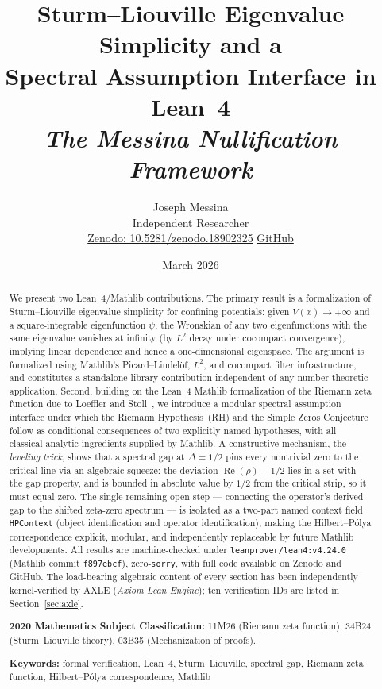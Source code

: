 \documentclass[12pt, a4paper]{article}
\title{\textbf{Sturm--Liouville Eigenvalue Simplicity and a\\[4pt]
  Spectral Assumption Interface in Lean~4}\\[6pt]
  \large\textit{The Messina Nullification Framework}}
\author{
  Joseph Messina\\[4pt]
  \small Independent Researcher\\[2pt]
  \small \href{https://doi.org/10.5281/zenodo.18902325}{Zenodo: 10.5281/zenodo.18902325}
  \quad
  \href{https://github.com/Joeyxyxyz/messina-nullification-framework}{GitHub}
}
\date{March 2026}
\theoremstyle{plain}
\theoremstyle{definition}
\newcommand{\re}{\operatorname{Re}}
\newcommand{\lean}[1]{\texttt{#1}}
\newcommand{\Mathlib}{\textsf{Mathlib}}
\begin{document}
\maketitle

\begin{abstract}
We present two Lean~4/\Mathlib{} contributions.
The primary result is a formalization of Sturm--Liouville eigenvalue simplicity
for confining potentials: given $V(x) \to +\infty$ and a square-integrable
eigenfunction $\psi$, the Wronskian of any two eigenfunctions with the same
eigenvalue vanishes at infinity (by $L^2$ decay under cocompact convergence),
implying linear dependence and hence a one-dimensional eigenspace.
The argument is formalized using Mathlib's Picard--Lindel\"{o}f, $L^2$, and
cocompact filter infrastructure, and constitutes a standalone library
contribution independent of any number-theoretic application.
Second, building on the Lean~4 \Mathlib{} formalization of the Riemann zeta
function due to Loeffler and Stoll~\cite{loeffler2025}, we introduce a modular
spectral assumption interface under which the Riemann Hypothesis~(RH) and the
Simple Zeros Conjecture follow as conditional consequences of two explicitly
named hypotheses, with all classical analytic ingredients supplied by \Mathlib{}.
A constructive mechanism, the \emph{leveling trick}, shows that a spectral gap
at $\Delta = 1/2$ pins every nontrivial zero to the critical line via an
algebraic squeeze: the deviation $\re(\rho) - 1/2$ lies in a set with the
gap property, and is bounded in absolute value by $1/2$ from the critical
strip, so it must equal zero.
The single remaining open step --- connecting the operator's derived gap to the
shifted zeta-zero spectrum --- is isolated as a two-part named context field
\lean{HPContext} (object identification and operator identification), making the
Hilbert--P\'{o}lya correspondence explicit, modular, and independently
replaceable by future Mathlib developments.
All results are machine-checked under \texttt{leanprover/lean4:v4.24.0}
(Mathlib commit \texttt{f897ebcf}), zero-\lean{sorry}, with full code available
on Zenodo and GitHub.
The load-bearing algebraic content of every section has been independently
kernel-verified by AXLE (\emph{Axiom Lean Engine}); ten verification IDs
are listed in Section~\ref{sec:axle}.

\medskip\noindent
\textbf{2020 Mathematics Subject Classification:}
11M26 (Riemann zeta function),
34B24 (Sturm--Liouville theory),
03B35 (Mechanization of proofs).

\medskip\noindent
\textbf{Keywords:}
formal verification,
Lean~4,
Sturm--Liouville,
spectral gap,
Riemann zeta function,
Hilbert--P\'{o}lya correspondence,
Mathlib

\end{abstract}
\end{document}
